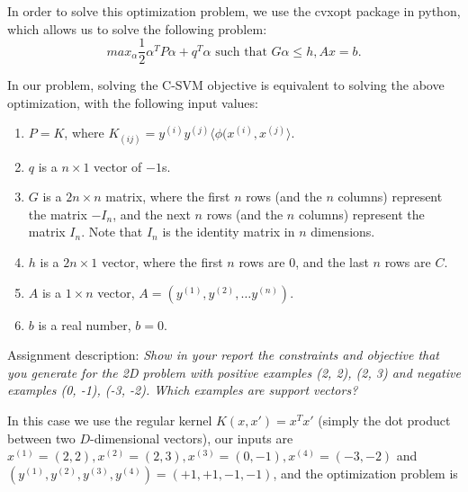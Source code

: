 \documentclass[10pt]{article}
\newcommand{\ds}{\displaystyle}
\begin{document}
In order to solve this optimization problem, we use the cvxopt package in python, which allows us to solve the following problem: $$\ds max_{\alpha}  \frac{1}{2} \alpha^TP\alpha + q^T\alpha \mbox{ such that } G\alpha \leq h, Ax =b.$$

In our problem, solving the C-SVM objective is equivalent to solving the above optimization, with the following input values: 
\begin{enumerate}
\item $\ds P = K$, where $\ds K_{(ij)} = y^{(i)}y^{(j)} \langle \phi(x^{(i)}, x^{(j)}\rangle$.
\item $\ds q$ is a $\ds n\times 1$ vector of $\ds -1$s.
\item $\ds G$ is a $\ds 2n\times n$ matrix, where the first $\ds n$ rows (and the $\ds n$ columns) represent the matrix $\ds - I_n$, and the next $\ds n$ rows (and the $\ds n$ columns) represent the matrix $\ds I_n$. Note that $\ds I_n$ is the identity matrix in $\ds n$ dimensions.
\item $\ds h$ is a $\ds 2n\times 1$ vector, where the first $\ds n$ rows are $\ds 0$, and the last $\ds n$ rows are $\ds C$.
\item $\ds A$ is a $\ds 1\times n$ vector, $\ds A = (y^{(1)}, y^{(2)}, \dots y^{(n)})$.
\item $\ds b$ is a real number, $\ds b=0$.

\end{enumerate}

Assignment description:\emph{
Show in your report the constraints and objective that you generate for the 2D problem with positive
examples (2, 2), (2, 3) and negative examples (0, -1), (-3, -2). Which examples are support vectors?}

In this case we use the regular kernel $\ds K(x,x') = x^Tx'$ (simply the dot product between two $\ds D$-dimensional vectors), our inputs are $\ds x^{(1)} = (2, 2), x^{(2)} = (2, 3), x^{(3)} = (0, -1), x^{(4)} = (-3, -2)$ and $\ds (y^{(1)}, y^{(2)}, y^{(3)}, y^{(4)}) = (+1, +1, -1, -1)$, and the optimization problem is
\end{document}
